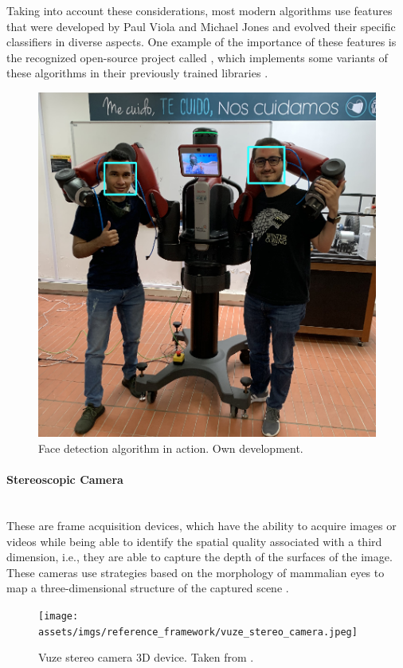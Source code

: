 \documentclass[11pt]{report} %
\newcommand{\subsubsubsection}[1]{\paragraph{#1}\mbox{}\\}
\begin{document}
Taking into account these considerations, most modern algorithms use features that were developed by Paul Viola and Michael Jones and evolved their specific classifiers in diverse aspects. One example of the importance of these features is the recognized open-source project called , which implements some variants of these algorithms in their previously trained  libraries \citep{cite_opencv_classifier_face_detection_general}.\\



\begin{figure}[H]
    \centering
    \includegraphics[width=0.8\linewidth]{assets/imgs/reference_framework/face_detection_example_us.png}
    \caption{Face detection algorithm in action. Own development.}
    \label{fig_face_detection_us_with_baxter}
\end{figure}


\subsubsubsection{Stereoscopic Camera}

These are frame acquisition devices, which have the ability to acquire images or videos while being able to identify the spatial quality associated with a third dimension, i.e., they are able to capture the depth of the surfaces of the image. These cameras use strategies based on the morphology of mammalian eyes to map a three-dimensional structure of the captured scene \citep{cite_stereoscopic_camera_techniques}.\\

\begin{figure}[H]
    \centering
    \texttt{[image: assets/imgs/reference\_framework/vuze\_stereo\_camera.jpeg]}
    \caption{Vuze stereo camera 3D device. Taken from \citep{cite_photo_vuze_stereo_camera_device}.} 
    \label{fig_vuz_stereo_camera_device}
\end{figure}
\end{document}
